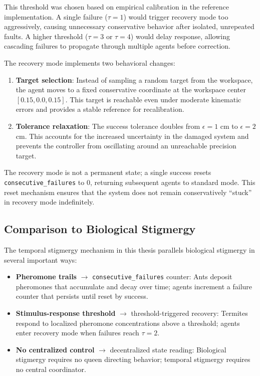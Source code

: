 \documentclass[12pt,a4paper,oneside]{report}
\begin{document}
This threshold was chosen based on empirical calibration in the reference implementation. A single failure ($\tau = 1$) would trigger recovery mode too aggressively, causing unnecessary conservative behavior after isolated, unrepeated faults. A higher threshold ($\tau = 3$ or $\tau = 4$) would delay response, allowing cascading failures to propagate through multiple agents before correction.

The recovery mode implements two behavioral changes:
\begin{enumerate}
    \item \textbf{Target selection}: Instead of sampling a random target from the workspace, the agent moves to a fixed conservative coordinate at the workspace center $[0.15, 0.0, 0.15]$. This target is reachable even under moderate kinematic errors and provides a stable reference for recalibration.
    \item \textbf{Tolerance relaxation}: The success tolerance doubles from $\epsilon = 1$ cm to $\epsilon = 2$ cm. This accounts for the increased uncertainty in the damaged system and prevents the controller from oscillating around an unreachable precision target.
\end{enumerate}

The recovery mode is not a permanent state; a single success resets \texttt{consecutive\_failures} to 0, returning subsequent agents to standard mode. This reset mechanism ensures that the system does not remain conservatively ``stuck'' in recovery mode indefinitely.

\subsection{Comparison to Biological Stigmergy}

The temporal stigmergy mechanism in this thesis parallels biological stigmergy in several important ways:
\begin{itemize}
    \item \textbf{Pheromone trails} $\rightarrow$ \texttt{consecutive\_failures} counter: Ants deposit pheromones that accumulate and decay over time; agents increment a failure counter that persists until reset by success.
    \item \textbf{Stimulus-response threshold} $\rightarrow$ threshold-triggered recovery: Termites respond to localized pheromone concentrations above a threshold; agents enter recovery mode when failures reach $\tau = 2$.
    \item \textbf{No centralized control} $\rightarrow$ decentralized state reading: Biological stigmergy requires no queen directing behavior; temporal stigmergy requires no central coordinator.
\end{itemize}
\end{document}
